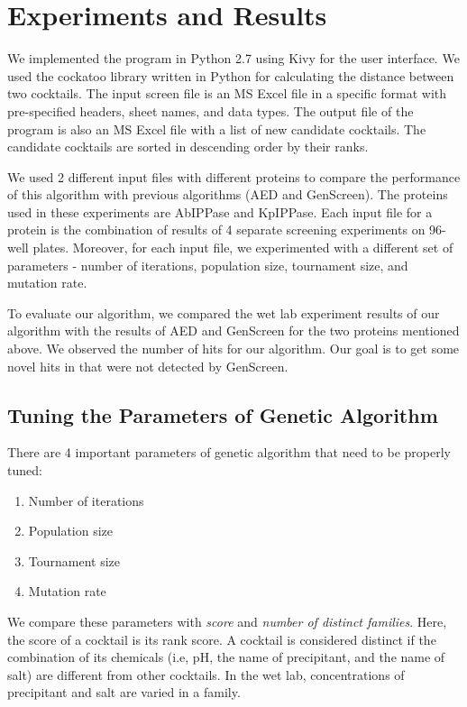 \chapter{Experiments and Results}
\label{ch:results}

We implemented the program in Python 2.7 using Kivy for the user interface. 
We used the cockatoo library written in Python for calculating the distance between two cocktails.
The input  screen file is an MS Excel file in a specific format with pre-specified headers, sheet names, and data types. The output file of the program is also an MS Excel file with a list of new candidate cocktails. The candidate cocktails are sorted in descending order by their ranks.

We used 2 different input files with different proteins to compare the performance of this algorithm with previous algorithms (AED\cite{OptimizeAED} and GenScreen\cite{SamyamThesis}). The proteins used in these experiments are AbIPPase and KpIPPase. Each input file for a protein is the combination of results of 4 separate screening experiments on 96-well plates. Moreover, for each input file, we experimented with a different set of parameters - number of iterations, population size, tournament size, and mutation rate.

To evaluate our algorithm, we compared the wet lab experiment results of our algorithm with the results of AED and GenScreen for the two proteins mentioned above. We observed the number of hits for our algorithm. Our goal is to get some novel hits in that were not detected by GenScreen.

\section{Tuning the Parameters of Genetic Algorithm} \label{sec:results-tuning}

There are 4 important parameters of genetic algorithm that need to be properly tuned:
  \begin{enumerate}
  \item Number of iterations
  \item Population size 
  \item Tournament size 
  \item Mutation rate 
  \end{enumerate}

We compare these parameters with \textit{score} and \textit{number of distinct families}. Here, the score of a cocktail is its rank score. A cocktail is considered distinct if the combination of its chemicals (i.e, pH, the name of precipitant, and the name of salt) are different from other cocktails. In the wet lab, concentrations of precipitant and salt are varied in a family.


